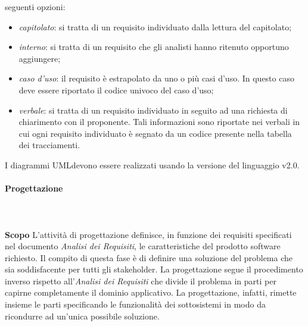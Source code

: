 \begin{itemize}
		seguenti opzioni:
		\begin{itemize}
			\item \textit{capitolato\glo}: si tratta di un requisito individuato dalla 
				lettura del capitolato\glo;
			\item \textit{interno}: si tratta di un requisito che gli analisti hanno 
				ritenuto opportuno aggiungere;
			\item \textit{caso d'uso}: il requisito è estrapolato da uno o più casi 
				d'uso. In questo caso deve essere riportato il codice univoco del caso d'uso;
			\item \textit{verbale}: si tratta di un requisito individuato in seguito ad 
				una richiesta di chiarimento con il proponente. Tali informazioni sono riportate 
				nei verbali in cui ogni requisito individuato è segnato da un codice presente 
				nella tabella dei tracciamenti. \\
		\end{itemize}
	\end{itemize}

 \newline \newline
I diagrammi UML\glosp devono essere realizzati usando la versione del 
linguaggio v2.0.

\paragraph{Progettazione} \mbox{}\\ \mbox{}\\
\textbf{Scopo} \newline \newline
L'attività di progettazione definisce, in funzione dei requisiti specificati 
nel documento \textit{Analisi dei Requisiti}, le caratteristiche del prodotto 
software richiesto. Il compito di questa fase è di definire una soluzione del 
problema che sia soddisfacente per tutti gli stakeholder. La progettazione segue 
il procedimento inverso rispetto all'\textit{Analisi dei Requisiti} che divide 
il problema in parti per capirne completamente il dominio applicativo. La 
progettazione, infatti, rimette insieme le parti specificando le funzionalità 
dei sottosistemi in modo da ricondurre ad un'unica possibile soluzione. \newline 
\newline

